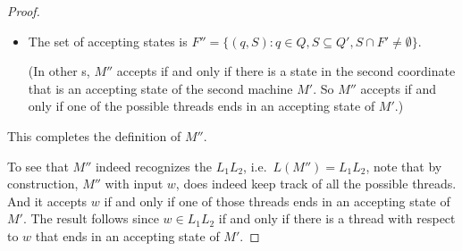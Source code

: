 \begin{flex}
\begin{proof}
\begin{itemize}
    \item The set of accepting states is $F'' = \{(q, S) : q \in Q, S \subseteq Q', S \cap F' \neq \emptyset \}$.

    (In other s, $M''$ accepts if and only if there is a state in the second coordinate that is an accepting state of the second machine $M'$. So $M''$ accepts if and only if one of the possible threads ends in an accepting state of $M'$.)

\end{itemize}

This completes the definition of $M''$. 

To see that $M''$ indeed recognizes the  $L_1 L_2$, i.e.~$L(M'') = L_1 L_2$, note that by construction, $M''$ with input $w$, does indeed keep track of all the possible threads. 
And it accepts $w$ if and only if one of those threads ends in an accepting state of $M'$. 
The result follows since $w \in L_1 L_2$ if and only if there is a thread with respect to $w$ that ends in an accepting state of $M'$.
\end{proof}
\end{flex}


